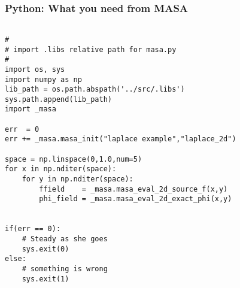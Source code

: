 \documentclass[mathserif]{beamer}
\begin{document}
\begin{frame}[fragile]
\frametitle{Python: What you need from MASA}
{\tiny
\begin{verbatim}

#
# import .libs relative path for masa.py
#
import os, sys
import numpy as np
lib_path = os.path.abspath('../src/.libs')
sys.path.append(lib_path)
import _masa

err  = 0
err += _masa.masa_init("laplace example","laplace_2d")

space = np.linspace(0,1.0,num=5)
for x in np.nditer(space):
    for y in np.nditer(space):
        ffield    = _masa.masa_eval_2d_source_f(x,y)
        phi_field = _masa.masa_eval_2d_exact_phi(x,y)


if(err == 0):
    # Steady as she goes
    sys.exit(0)
else:
    # something is wrong
    sys.exit(1)

\end{verbatim}
}
\end{frame}


\end{document}
